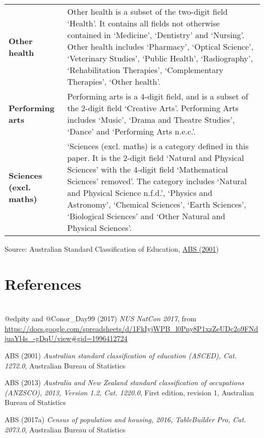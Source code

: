 \documentclass[]{book}
\begin{document}
\begin{longtable}[]{@{}ll@{}}
\textbf{Other health} & Other health is a subset of the two-digit field `Health'. It contains all fields not otherwise contained in `Medicine', `Dentistry' and `Nursing'. Other health includes `Pharmacy', `Optical Science', `Veterinary Studies', `Public Health', `Radiography', `Rehabilitation Therapies', `Complementary Therapies', `Other health'.\tabularnewline
\textbf{Performing arts} & Performing arts is a 4-digit field, and is a subset of the 2-digit field `Creative Arts'. Performing Arts includes `Music', `Drama and Theatre Studies', `Dance' and `Performing Arts n.e.c.'.\tabularnewline
\textbf{Sciences (excl. maths)} & `Sciences (excl. maths) is a category defined in this paper. It is the 2-digit field `Natural and Physical Sciences' with the 4-digit field `Mathematical Sciences' removed'. The category includes `Natural and Physical Science n.f.d.', `Physics and Astronomy', `Chemical Sciences', `Earth Sciences', `Biological Sciences' and `Other Natural and Physical Sciences'.\tabularnewline
\bottomrule
\end{longtable}

Source: Australian Standard Classification of Education, \protect\hyperlink{_ENREF_2}{ABS (2001})

\hypertarget{references}{%
\chapter{References}\label{references}}

\hypertarget{section-9}{%
\chapter{}\label{section-9}}

@edpity and @Conor\_Day99 (2017) \emph{NUS NatCon 2017}, from \url{https://docs.google.com/spreadsheets/d/1FkIyjWPB_l0Pny8P1xzZeUDc2o9FNdjuaYl4s_-gDqU/view\#gid=1996412724}

\protect\hypertarget{_ENREF_2}{}{}ABS (2001) \emph{Australian standard classification of education (ASCED), Cat. 1272.0}, Australian Bureau of Statistics

ABS (2013) \emph{Australia and New Zealand standard classification of occupations (ANZSCO), 2013, Version 1.2, Cat. 1220.0}, First edition, revision 1, Australian Bureau of Statistics

\protect\hypertarget{_ENREF_4}{}{}ABS (2017a) \emph{Census of population and housing, 2016, TableBuilder Pro, Cat. 2073.0}, Australian Bureau of Statistics
\end{document}

